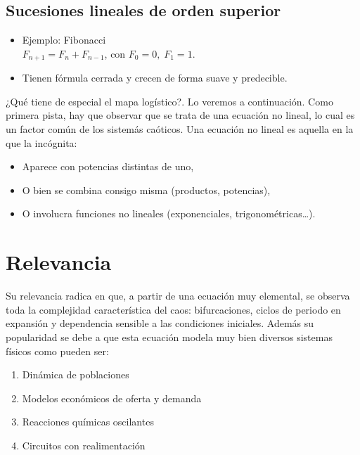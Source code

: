 \documentclass[
  11pt,
  a4paper,
  DIV=11,
  numbers=noendperiod]{scrreprt}
\providecommand{\tightlist}{%
  \setlength{\itemsep}{0pt}\setlength{\parskip}{0pt}}
\begin{document}
\subsection{Sucesiones lineales de orden
superior}\label{sucesiones-lineales-de-orden-superior}

\begin{itemize}
\tightlist
\item
  Ejemplo: Fibonacci\\
  \(F_{n+1} = F_n + F_{n-1}\), con \(F_0=0,\;F_1=1\).\\
\item
  Tienen fórmula cerrada y crecen de forma suave y predecible.
\end{itemize}

¿Qué tiene de especial el mapa logístico?. Lo veremos a continuación.
Como primera pista, hay que observar que se trata de una ecuación no
lineal, lo cual es un factor común de los sistemás caóticos. Una
ecuación no lineal es aquella en la que la incógnita:

\begin{itemize}
\tightlist
\item
  Aparece con potencias distintas de uno,
\item
  O bien se combina consigo misma (productos, potencias),
\item
  O involucra funciones no lineales (exponenciales,
  trigonométricas\ldots).
\end{itemize}

\section{Relevancia}\label{relevancia}

Su relevancia radica en que, a partir de una ecuación muy elemental, se
observa toda la complejidad característica del caos: bifurcaciones,
ciclos de periodo en expansión y dependencia sensible a las condiciones
iniciales. Además su popularidad se debe a que esta ecuación modela muy
bien diversos sistemas físicos como pueden ser:

\begin{enumerate}
\def\labelenumi{\arabic{enumi}.}
\tightlist
\item
  Dinámica de poblaciones
\item
  Modelos económicos de oferta y demanda
\item
  Reacciones químicas oscilantes
\item
  Circuitos con realimentación
\end{enumerate}
\end{document}
